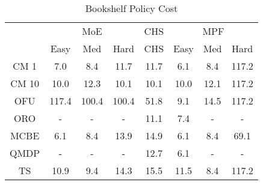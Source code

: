 \begin{table}[]
\centering
\begin{tabular}{|c|c|c|c|c|c|c|c|}
\hline
& \multicolumn{3}{c|}{MoE} & CHS & \multicolumn{3}{c|}{MPF} 
 \\ 
 & Easy & Med & Hard & CHS & Easy & Med & Hard\\\hline
CM 1 &   7.0 &   8.4 &  11.7 &  11.7 &   6.1 &   8.4 & 117.2\\
\hline
CM 10 &  10.0 &  12.3 &  10.1 &  10.1 &  10.0 &  12.1 & 117.2\\
\hline
OFU & 117.4 & 100.4 & 100.4 &  51.8 &   9.1 &  14.5 & 117.2\\
\hline
ORO & - & - & - &  11.1 &   7.4 & - & -\\
\hline
MCBE &   6.1 &   8.4 &  13.9 &  14.9 &   6.1 &   8.4 &  69.1\\
\hline
QMDP & - & - & - &  12.7 &   6.1 & - & -\\
\hline
TS &  10.9 &   9.4 &  14.3 &  15.5 &  11.5 &   8.4 & 117.2\\
\hline
\end{tabular}
\caption{Bookshelf Policy Cost}
\label{tab:experiment_Bookshelf_cost}
\end{table}
